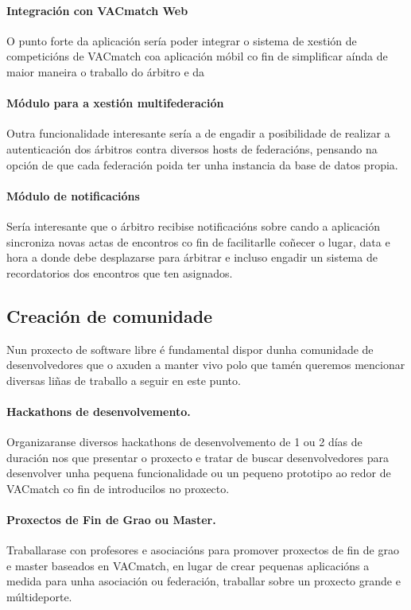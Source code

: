    \paragraph{Integración con VACmatch Web} O punto forte da aplicación sería 
poder integrar o sistema de xestión de competicións de VACmatch coa aplicación 
móbil co fin de simplificar aínda de maior maneira o traballo do árbitro e da 

    \paragraph{Módulo para a xestión multifederación} Outra funcionalidade 
interesante sería a de engadir a posibilidade de realizar a autenticación dos 
árbitros contra diversos hosts de federacións, pensando na opción de que cada 
federación poida ter unha instancia da base de datos propia.

    \paragraph{Módulo de notificacións} Sería interesante que o árbitro 
recibise notificacións sobre cando a aplicación sincroniza novas actas de 
encontros co fin de facilitarlle coñecer o lugar, data e hora a donde debe 
desplazarse para árbitrar e incluso engadir un sistema de recordatorios dos 
encontros que ten asignados.

  \subsection{Creación de comunidade}
  Nun proxecto de software libre é fundamental dispor dunha comunidade de 
desenvolvedores que o axuden a manter vivo polo que tamén queremos mencionar 
diversas liñas de traballo a seguir en este punto.

    \paragraph{Hackathons de desenvolvemento.} Organizaranse diversos 
hackathons de desenvolvemento de 1 ou 2 días de duración nos que presentar o 
proxecto e tratar de buscar desenvolvedores para desenvolver unha pequena 
funcionalidade ou un pequeno prototipo ao redor de VACmatch co fin de 
introducilos no proxecto.

    \paragraph{Proxectos de Fin de Grao ou Master.} Traballarase con profesores 
e asociacións para promover proxectos de fin de grao e master baseados en 
VACmatch, en lugar de crear pequenas aplicacións a medida para unha asociación 
ou federación, traballar sobre un proxecto grande e múltideporte.

